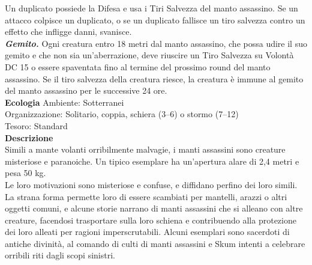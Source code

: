\begin{multicols}{2}
Un duplicato possiede la Difesa e usa i Tiri Salvezza del manto assassino. Se un attacco colpisce un duplicato, o se un duplicato fallisce un tiro salvezza contro un effetto che infligge danni, svanisce.\\
\emph{\textbf{Gemito.}} Ogni creatura entro 18 metri dal manto assassino, che possa udire il suo gemito e che non sia un'aberrazione, deve riuscire un Tiro Salvezza su Volontà DC  15 o essere spaventata fino al termine del prossimo round del manto assassino. Se il tiro salvezza della creatura riesce, la creatura è immune al gemito del manto assassino per le successive 24 ore.\\
\textbf{Ecologia}
Ambiente: Sotterranei\\
Organizzazione: Solitario, coppia, schiera (3–6) o stormo (7–12)\\
Tesoro: Standard\\
\textbf{Descrizione}\\
Simili a mante volanti orribilmente malvagie, i manti assassini sono creature misteriose e paranoiche. Un tipico esemplare ha un'apertura alare di 2,4 metri e pesa 50 kg.\\

Le loro motivazioni sono misteriose e confuse, e diffidano perfino dei loro simili. La strana forma permette loro di essere scambiati per mantelli, arazzi o altri oggetti comuni, e alcune storie narrano di manti assassini che si alleano con altre creature, facendosi trasportare sulla loro schiena e contribuendo alla protezione dei loro alleati per ragioni imperscrutabili. Alcuni esemplari sono sacerdoti di antiche divinità, al comando di culti di manti assassini e Skum intenti a celebrare orribili riti dagli scopi sinistri.\\



\end{multicols}
